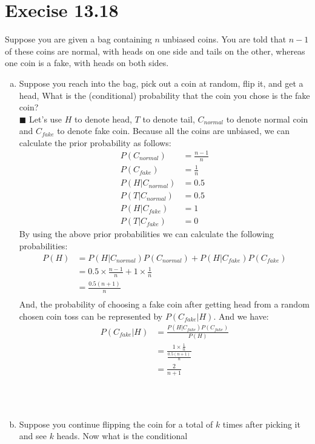 \documentclass{article}
\newcommand{\solution}[1]{~\\ $\blacksquare$ \sffamily\upshape\selectfont #1
\normalfont ~\\~ }
\begin{document}
\section{Execise 13.18}
Suppose you are given a bag containing $n$ unbiased coins. You are told
that $n-1$ of these coins are normal, with heads on one side and tails
on the other, whereas one coin is a fake, with heads on both sides.
\begin{enumerate}[a.]
  \item Suppose you reach into the bag, pick out a coin at random,
    flip it, and get a head, What is the (conditional) probability that
    the coin you chose is the fake coin?
    \solution{Let's use $H$ to denote head, $T$ to denote tail,
      $C_{normal}$ to denote normal coin and $C_{fake}$ to denote fake
      coin. Because all the coins are unbiased, we can calculate the
      prior probability as follows:  
      \begin{align*}
        P(C_{normal}) & = \frac{n-1}{n} \\ 
        P(C_{fake}) & = \frac{1}{n} \\
        P(H|C_{normal}) & = 0.5 \\ 
        P(T|C_{normal}) & = 0.5 \\
        P(H|C_{fake}) & = 1 \\ 
        P(T|C_{fake}) & = 0
      \end{align*}
      By using the above prior probabilities we can calculate the
      following probabilities: 
      \begin{align*}
        P(H) & = P(H|C_{normal})P(C_{normal}) + P(H|C_{fake})P(C_{fake})  \\
        & = 0.5\times \frac{n-1}{n} + 1\times \frac{1}{n} \\
        & = \frac{0.5(n+1)}{n} \\
      \end{align*}
      And, the probability of choosing a fake coin after getting
      head from a random chosen coin toss can be represented by
      $P(C_{fake}|H)$. And we have: 
      \begin{align*}
        P(C_{fake}|H) & = \frac{P(H|C_{fake})P(C_{fake})}{P(H)} \\
        & = \frac{1\times \frac{1}{n}}{\frac{0.5(n+1)}{n}} \\
        & = \frac{2}{n+1}
      \end{align*}
} 
  \item Suppose you continue flipping the coin for a total of $k$ times
    after picking it and see $k$ heads. Now what is the conditional

\end{enumerate}
\end{document}
